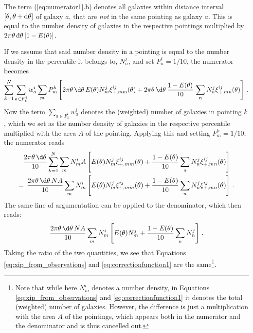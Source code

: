 The term (\ref{eq:numerator1}.b) denotes all galaxies within distance interval $[\theta,\theta+{\rm d}\theta]$ of galaxy $a$, that are \textit{not} in the same pointing as galaxy $a$. This is equal to the number density of galaxies in the respective pointings multiplied by $2\pi\theta\, {\rm d}\theta\, [1-E(\theta)]$. 
 
If we assume that said number density in a pointing is equal to the number density in the percentile it belongs to, $N_n^j$, and set $P_n^\ell=1/10$, the numerator becomes \begin{align}
\sum_{k=1}^N \sum_{a\in F_k^i} w_a^i \sum_m P^k_m \left[2\pi\theta\,\d\theta\,E(\theta) N_m^j \xi_{+,mm}^{ij}(\theta) + 2\pi\theta\,\d\theta\,\frac{1-E(\theta)}{10}\, \sum_n N_n^j \xi_{+,mn}^{ij}(\theta) \right] \, .
\end{align}
Now the term $\sum_{a\in F_k^i} w_a^i$ denotes the (weighted) number of galaxies in pointing $k$, which we set as the number density of galaxies in the respective percentile multiplied with the area $A$ of the pointing. Applying this and setting $P_m^k=1/10$, the numerator reads 
\begin{align}
\frac{2\pi\theta\,\d\theta}{10} \sum_{k=1}^N \sum_m N_m^i A &\left[ E(\theta) N_m^j \xi_{+,mm}^{ij}(\theta) + \frac{1-E(\theta)}{10}\sum_n N_n^j\xi_{+,mn}^{ij}(\theta)\right] \nonumber\\
 =  \, \frac{2\pi\theta\,\d\theta \, NA}{10}  \sum_m N_m^i &\left[ E(\theta) N_m^j \xi_{+,mm}^{ij}(\theta) + \frac{1-E(\theta)}{10}\sum_n N_n^j\xi_{+,mn}^{ij}(\theta)\right] \, .
\end{align}
%
 The same line of argumentation can be applied to the denominator, which then reads: \[
\frac{2\pi\theta\,\d\theta \, NA}{10}  \sum_m N_m^i \left[ E(\theta) N_m^j + \frac{1-E(\theta)}{10}\sum_n N_n^j\right]\, .
 \]
Taking the ratio of the two quantities, we see that Equations \eqref{eq:xip_from_observations} and \eqref{eq:correctionfunction1} are the same\footnote{Note that while here $N_m^i$ denotes a number density, in Equations \eqref{eq:xip_from_observations} and \eqref{eq:correctionfunction1} it denotes the total (weighted) number of galaxies. However, the difference is just a multiplication with the area $A$ of the pointings, which appears both in the numerator and the denominator and is thus cancelled out.}.
